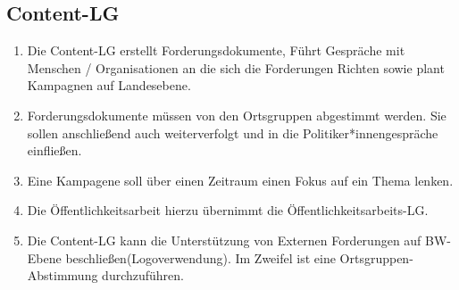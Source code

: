 \documentclass[a4paper,
  ]{scrartcl}
\begin{document}
\subsection{Content-LG}
\begin{enumerate}
      \item Die Content-LG erstellt Forderungsdokumente, Führt Gespräche mit Menschen / Organisationen
            an die sich die Forderungen Richten sowie plant Kampagnen auf Landesebene.
      \item Forderungsdokumente müssen von den Ortsgruppen abgestimmt werden. Sie sollen anschließend
            auch weiterverfolgt und in die Politiker*innengespräche einfließen.
      \item Eine Kampagene soll über einen Zeitraum einen Fokus auf ein Thema lenken.
      \item Die Öffentlichkeitsarbeit hierzu übernimmt die Öffentlichkeitsarbeits-LG.
      \item Die Content-LG kann die Unterstützung von Externen Forderungen auf BW-Ebene
            beschließen(Logoverwendung). Im Zweifel ist eine Ortsgruppen-Abstimmung durchzuführen.
\end{enumerate}
\end{document}

